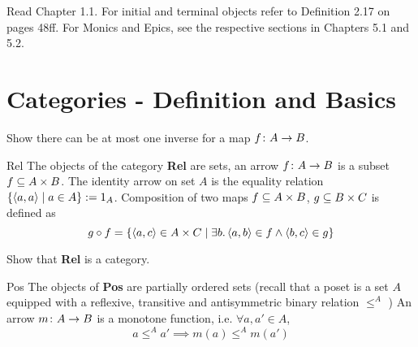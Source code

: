 \def\pathToRoot{../../}




\author{Sarah Mameche, Andreas Meyer, Leonhard Staut}

\begin{hint}
  Read Chapter 1.1. For initial and terminal objects refer to Definition 2.17 on pages 48ff. For Monics and Epics, see the respective sections in Chapters 5.1 and 5.2.
\end{hint}

%

\section{Categories - Definition and Basics}

\begin {exercise}
Show there can be at most one inverse for a map $f \from A \to B$.
\end{exercise}

\begin {definition}{Rel}
The objects of the category \textbf{Rel} are sets, an arrow $f \from A \to B$ is a subset $f \subseteq A \times B$.
The identity arrow on set $A$ is the equality relation $\{\left\langle a,a\right\rangle \mathrel{|} a \in A\} := 1_A$.
Composition of two maps $f \subseteq A \times B$, $g \subseteq B \times C$ is defined as
\[ g \mathbin{\circ} f = \{ \left\langle a, c\right\rangle \in A \times C \mathrel{|} \exists b. \left\langle a, b\right\rangle \in f \land \left\langle b, c\right\rangle \in g\} \]
\end{definition}

\begin {exercise}
Show that \textbf{Rel} is a category.
\end{exercise}


\begin{definition}{Pos} The objects of  \textbf{Pos} are partially ordered sets
(recall that a poset is a set $A$ equipped with a reflexive, transitive and antisymmetric binary relation $\leq^A $ )
An arrow $ m \from A \to B $ is a monotone function, i.e. $\forall a, a' \in A$,
\[a \leq^A a' \implies m(a) \leq^A m(a')\]
\end{definition}

